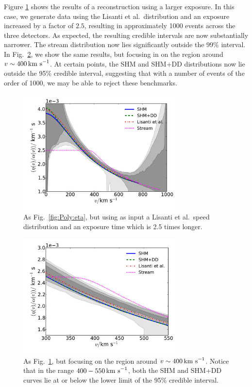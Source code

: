 Figure \ref{fig:Poly:eta_hires} shows the results of a reconstruction using a larger exposure. In this case, we generate data using the Lisanti et al.\ distribution and an exposure increased by a factor of $2.5$, resulting in approximately 1000 events across the three detectors. As expected, the resulting credible intervals are now substantially narrower. The stream distribution now lies significantly outside the 99\% interval. In Fig.~\ref{fig:Poly:eta_hires_zoom}, we show the same results, but focusing in on the region around $v \sim 400 \,\textrm{km s}^{-1}$. At certain points, the SHM and SHM+DD distributions now lie outside the 95\% credible interval, suggesting that with a number of events of the order of 1000, we may be able to reject these benchmarks.

\begin{figure}[t]
\centering
  \includegraphics[width=0.75\textwidth]{Poly/LIS_hires.pdf}
  \caption{As Fig.~\ref{fig:Poly:eta}, but using as input a Lisanti et al.\ speed distribution and an exposure time which is 2.5 times longer.}
  \label{fig:Poly:eta_hires}
\end{figure}


\begin{figure}[t]
\centering
  \includegraphics[width=0.75\textwidth]{Poly/LIS_hires_zoom.pdf}
  \caption{As Fig.~\ref{fig:Poly:eta_hires}, but focusing on the region around $v \sim 400 \,\textrm{km s}^{-1}$. Notice that in the range $400-550 \,\textrm{km s}^{-1}$, both the SHM and SHM+DD curves lie at or below the lower limit of the 95\% credible interval.}
  \label{fig:Poly:eta_hires_zoom}
\end{figure}

